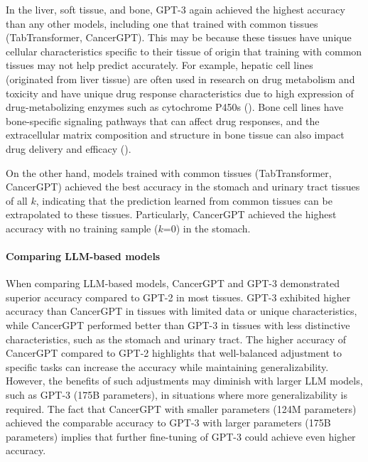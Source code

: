 In the liver, soft tissue, and bone, GPT-3 again achieved the highest accuracy than any other models, including one that trained with common tissues (TabTransformer, CancerGPT). This may be because these tissues have unique cellular characteristics specific to their tissue of origin that training with common tissues may not help predict accurately. For example, hepatic cell lines (originated from liver tissue) are often used in research on drug metabolism and toxicity and have unique drug response characteristics due to high expression of drug-metabolizing enzymes such as cytochrome P450s (\cite{guo_similarities_2011}). Bone cell lines have bone-specific signaling pathways that can affect drug responses, and the extracellular matrix composition and structure in bone tissue can also impact drug delivery and efficacy (\cite{lin_bone_2020}). 

On the other hand, models trained with common tissues (TabTransformer, CancerGPT) achieved the best accuracy in the stomach and urinary tract tissues of all $k$, indicating that the prediction learned from common tissues can be extrapolated to these tissues. Particularly, CancerGPT achieved the highest accuracy with no training sample ($k$=0) in the stomach.  

\paragraph{Comparing LLM-based models}
When comparing LLM-based models, CancerGPT and GPT-3 demonstrated superior accuracy compared to GPT-2 in most tissues. GPT-3 exhibited higher accuracy than CancerGPT in tissues with limited data or unique characteristics, while CancerGPT performed better than GPT-3 in tissues with less distinctive characteristics, such as the stomach and urinary tract. The higher accuracy of CancerGPT compared to GPT-2 highlights that well-balanced adjustment to specific tasks can increase the accuracy while maintaining generalizability. However, the benefits of such adjustments may diminish with larger LLM models, such as GPT-3 (175B parameters), in situations where more generalizability is required.  The fact that CancerGPT with smaller parameters (124M parameters) achieved the comparable accuracy to GPT-3 with larger parameters (175B parameters) implies that further fine-tuning of GPT-3 could achieve even higher accuracy. 

